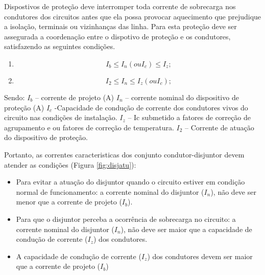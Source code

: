 Dispostivos de proteção deve interromper toda corrente de sobrecarga nos condutores dos circuitos antes que ela possa provocar aquecimento que prejudique a isolação, terminais ou vizinhanças das linha. Para esta proteção deve ser assegurada a coordenação entre o dispotivo de proteção e os condutores, satisfazendo as seguintes condições.
\begin{enumerate}
\item \begin{equation}
		I_{b} \leq I_{n} (ou I_{c}) \leq I_{z};
		\end{equation}
\item \begin{equation}
		I_{2} \leq I_{n} \leq I_{z}(ou I_{c});
		\end{equation}
\end{enumerate}

Sendo:
$I_{b}$ – corrente de projeto (A)
$I_{n}$ – corrente nominal do dispositivo de proteção (A)
$I_{c}$ -Capacidade de condução de corrente dos condutores vivos do circuito nas condições de instalação.
$I_{z}$ –  Ic submetido a fatores de correção de agrupamento e ou fatores de correção de temperatura.
$I_{2}$ – Corrente de atuação do dispositivo de proteção.

Portanto, as correntes caracteristicas dos conjunto condutor-disjuntor devem atender as condições (Figura \ref{fig:disjatu}):
\begin{itemize}
\item Para evitar a atuação do disjuntor quando o circuito estiver em condição normal de funcionamento: a corrente nominal do disjuntor ($I_{n}$), não deve ser menor que a corrente de projeto ($I_{b}$).
\item Para que o disjuntor perceba a ocorrência de sobrecarga no circuito: a corrente nominal do disjuntor ($I_{n}$), não deve ser maior que a capacidade de condução de corrente ($I_{z}$) dos condutores.
\item A capacidade de condução de corrente ($I_{z}$) dos condutores devem ser maior que a corrente de projeto ($I_{b}$)

\end{itemize}


